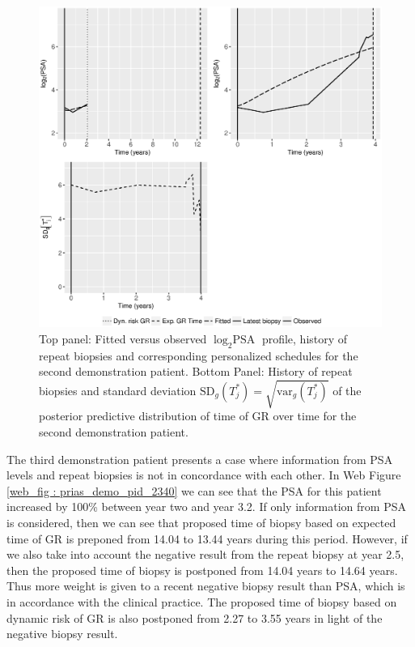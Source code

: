 \begin{figure}
\centerline{\includegraphics[width=\columnwidth]{images/prias_demo/case_3174_t3.eps}}
\caption{Top panel: Fitted versus observed $\log_2 \mbox{PSA}$ profile, history of repeat biopsies and corresponding personalized schedules for the second demonstration patient. Bottom Panel: History of repeat biopsies and standard deviation $\mbox{SD}_g(T^*_j) = \sqrt{\mbox{var}_g(T^*_j)}$ of the posterior predictive distribution of time of GR over time for the second demonstration patient.}
\label{fig : prias_demo_pid_3174}
\end{figure}

\clearpage

The third demonstration patient presents a case where information from PSA levels and repeat biopsies is not in concordance with each other. In Web Figure \ref{web_fig : prias_demo_pid_2340} we can see that the PSA for this patient increased by 100\% between year two and year 3.2. If only information from PSA is considered, then we can see that proposed time of biopsy based on expected time of GR is preponed from 14.04 to 13.44 years during this period. However, if we also take into account the negative result from the repeat biopsy at year 2.5, then the proposed time of biopsy is postponed from 14.04 years to 14.64 years. Thus more weight is given to a recent negative biopsy result than PSA, which is in accordance with the clinical practice. The proposed time of biopsy based on dynamic risk of GR is also postponed from 2.27 to 3.55 years in light of the negative biopsy result.

